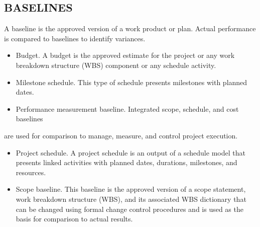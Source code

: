 \documentclass[11pt]{article}
\begin{document}
\subsection{BASELINES}
\label{sec:orgbcf507f}
A baseline is the approved version of a work product or plan. Actual performance is compared to baselines to identify variances.
\begin{itemize}
\item Budget. A budget is the approved estimate for the project or any work breakdown structure (WBS) component or any schedule activity.
\item Milestone schedule. This type of schedule presents milestones with planned dates.
\item Performance measurement baseline. Integrated scope, schedule, and cost baselines
\end{itemize}
are used for comparison to manage, measure, and control project execution.
\begin{itemize}
\item Project schedule. A project schedule is an output of a schedule model that presents linked activities with planned dates, durations, milestones, and resources.
\item Scope baseline. This baseline is the approved version of a scope statement, work breakdown structure (WBS), and its associated WBS dictionary that can be changed using formal change control procedures and is used as the basis for comparison to actual results.
\end{itemize}
\end{document}
